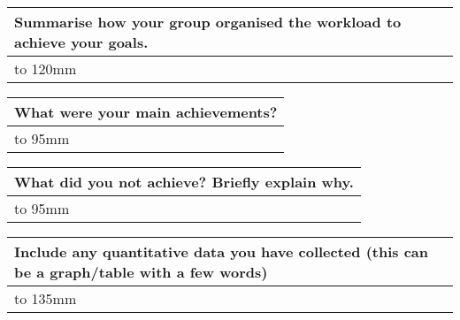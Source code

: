 \documentclass[a4paper]{article}
\newcommand{\colWidth}{141mm}
\begin{document}
\begin{center}

\begin{tabular}{|p{\colWidth}|}
	\hline
	\cellcolor{blue!25}\large
	\textbf{Summarise how your group organised the workload to achieve your goals.}
	\\ \hline
	\vtop to 120mm{
  }
  \\
  \hline
\end{tabular}
\vskip 5mm


\begin{tabular}{|p{\colWidth}|}
	\hline
	\cellcolor{blue!25}\large
	\textbf{What were your main achievements?}
	\\ \hline
	\vtop to 95mm{

  }
  \\
  \hline
\end{tabular}
\vskip 5mm


\begin{tabular}{|p{\colWidth}|}
	\hline
	\cellcolor{blue!25}\large
	\textbf{What did you not achieve? Briefly explain why.}
	\\ \hline
	\vtop to 95mm{

  }
  \\
  \hline
\end{tabular}
\vskip 5mm


\begin{tabular}{|p{\colWidth}|}
	\hline
	\cellcolor{blue!25}\large
	\textbf{Include any quantitative data you have collected (this can be a graph/table with a few words)}
	\\ \hline
	\vtop to 135mm{

  }
  \\
  \hline
\end{tabular}
\vskip 5mm


\end{center}
\end{document}
